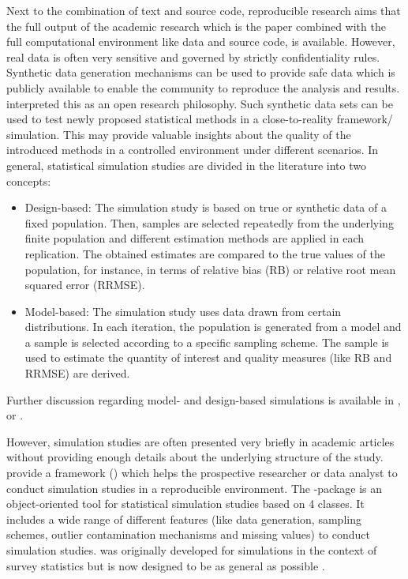 \documentclass[article]{ajs}
\begin{document}
Next to the combination of text and source code, reproducible research aims that the full output of the academic research which is the paper combined with the full computational environment like data and source code, is available. However, real data is often very sensitive and governed by strictly confidentiality rules. Synthetic data generation mechanisms \citep{Kol11} can be used to provide safe data which is publicly available to enable the community to reproduce the analysis and results. \cite{Bur14} interpreted this as an open research philosophy. Such synthetic data sets can be used to test newly proposed statistical methods in a close-to-reality framework/ simulation. This may provide valuable insights about the quality of the introduced methods in a controlled environment under different scenarios. In general, statistical simulation studies are divided in the literature into two concepts:
\begin{itemize}
\item Design-based: The simulation study is based on true or synthetic data of a fixed population. Then, samples are selected repeatedly from the underlying finite population and different estimation methods are applied in each replication. The obtained estimates are compared to the true values of the population, for instance, in terms of relative bias (RB) or relative root mean squared error (RRMSE).
\item Model-based: The simulation study uses data drawn from certain distributions. In each iteration, the population is generated from a model and a sample is selected according to a specific sampling scheme. The sample is used to estimate the quantity of interest and quality measures (like RB and RRMSE) are derived.  
\end{itemize}
Further discussion regarding model- and design-based simulations is available in \cite{Mue03}, \cite{Sal10} or \cite{Alf10}.

However, simulation studies are often presented very briefly in academic articles without providing enough details about the underlying structure of the study. \cite{Alf10} provide a framework () which helps the prospective researcher or data analyst to conduct simulation studies in a reproducible environment. The -package  \citep{Alf10} is an object-oriented tool for statistical simulation studies based on 4 classes. It includes a wide range of different features (like data generation, sampling schemes, outlier contamination mechanisms and missing values) to conduct simulation studies.  was originally developed for simulations in the context of survey statistics but is now designed to be as general as possible \citep[cf.][]{Alf10}.
\end{document}
